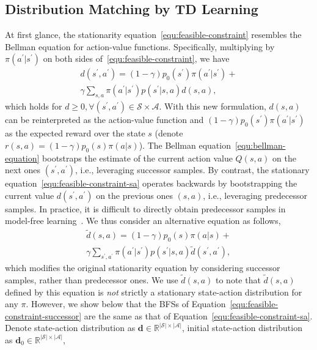 \documentclass[letterpaper]{article} %
\newcommand{\m}[1]{\mathbf{#1}}
\begin{document}
\subsection{Distribution Matching by TD Learning}
At first glance, the stationarity equation~\eqref{equ:feasible-constraint} resembles the Bellman equation for action-value functions.
Specifically, multiplying by $\pi(a^\prime|s^\prime)$ on both sides of~\eqref{equ:feasible-constraint}, we have
\begin{multline}\label{equ:feasible-constraint-sa}
d(s^\prime, a^\prime) = (1-\gamma) p_0(s^\prime)\pi(a^\prime|s^\prime) + \\
\gamma\sum_{s, a}\pi(a^\prime|s^\prime) p(s^\prime|s, a)d(s, a),
\end{multline}
which holds for $d\geq 0, \forall (s^\prime, a^\prime)\in\mathcal{S}\times\mathcal{A}$.
With this new formulation, $d(s, a)$ can be reinterpreted as the action-value function and $(1-\gamma)p_0(s^\prime)\pi(a^\prime|s^\prime)$ as the expected reward over the state $s$ (denote $r(s, a) = (1-\gamma)p_0(s)\pi(a|s)$).
The Bellman equation~\eqref{equ:bellman-equation} bootstraps the estimate of the current action value $Q(s, a)$ on the next ones $(s^\prime , a^\prime)$,
i.e., leveraging successor samples.  By contrast, the stationary equation~\eqref{equ:feasible-constraint-sa} operates backwards by bootstrapping the current value $d(s^\prime, a^\prime)$ on the previous ones $(s, a)$,
i.e., leveraging predecessor samples.
In practice, it is difficult to directly obtain predecessor samples in model-free learning~\cite{liu2018breaking}.
We thus consider an alternative equation as follows,
\begin{multline}\label{equ:feasible-constraint-successor}
\tilde{d}(s, a) = (1-\gamma) p_0(s)\pi(a|s) + \\
\gamma\sum_{s^\prime, a^\prime}\pi(a^\prime|s^\prime) p(s^\prime|s, a) \tilde{d}(s^\prime, a^\prime),
\end{multline}
which modifies the original stationarity equation by considering successor samples, rather than predecessor ones.
We use $\tilde{d}(s, a)$ to note that $\tilde{d}(s, a)$ defined by this equation is \emph{not} strictly a stationary state-action distribution for any $\pi$.
However, we show below that the BFSs of Equation~\eqref{equ:feasible-constraint-successor} are the same as that of Equation~\eqref{equ:feasible-constraint-sa}.
Denote state-action distribution as $\m{d} \in\mathbb{R}^{|\mathcal{S}|\times|\mathcal{A}|}$,
initial state-action distribution as $\m{d}_0 \in\mathbb{R}^{|\mathcal{S}|\times|\mathcal{A}|}$,
\end{document}
